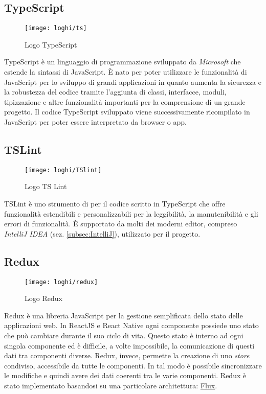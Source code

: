 \subsection{TypeScript} \label{subsec:tslint}
\begin{figure}[H] 
	\centering
	\texttt{[image: loghi/ts]}
	\caption{Logo TypeScript}
\end{figure}
TypeScript è un linguaggio di programmazione sviluppato da \emph{Microsoft} che 
estende la sintassi di JavaScript.  È nato per poter utilizzare le funzionalità di 
JavaScript per lo sviluppo di grandi applicazioni in quanto aumenta la 
sicurezza e la robustezza del codice tramite l'aggiunta di classi, interfacce, 
moduli, tipizzazione e altre funzionalità importanti per la comprensione di un 
grande progetto. 
Il codice TypeScript sviluppato viene successivamente ricompilato in JavaScript 
per poter essere interpretato da browser o app.

\subsection{TSLint}
\begin{figure}[H] 
	\centering
	\texttt{[image: loghi/TSlint]}
	\caption{Logo TS Lint}
\end{figure}
TSLint è uno strumento di  per il codice scritto in TypeScript 
che offre funzionalità estendibili e personalizzabili per la leggibilità, la 
manutenibilità e gli errori di funzionalità. 
È supportato da molti dei moderni editor, compreso \emph{IntelliJ IDEA} (sez. 
\ref{subsec:IntelliJ}), utilizzato per il progetto.

\subsection{Redux} \label{subsec:Redux}
\begin{figure}[H] 
	\centering
	\texttt{[image: loghi/redux]}
	\caption{Logo Redux}
\end{figure}
Redux è una libreria JavaScript per la gestione semplificata dello stato delle 
applicazioni web. In ReactJS e React Native ogni componente possiede uno stato 
che può cambiare durante il suo ciclo di vita. Questo stato è interno ad ogni 
singola componente ed è difficile, a volte impossibile, la comunicazione di questi 
dati tra componenti diverse. 
Redux, invece, permette la creazione di uno \emph{store} condiviso, accessibile da tutte 
le componenti. In tal modo è possibile sincronizzare le modifiche e quindi 
avere dei dati coerenti tra le varie componenti. 
Redux è stato implementato basandosi su una particolare architettura: 
\hyperref[subsec:flux]{Flux}.

